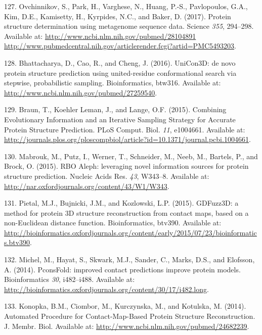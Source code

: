 \documentclass[11pt,a4paper,twoside]{book}
\theoremstyle{definition}
\theoremstyle{definition}
\theoremstyle{remark}
\begin{document}
\hypertarget{ref-Ovchinnikov2017}{}
127. Ovchinnikov, S., Park, H., Varghese, N., Huang, P.-S., Pavlopoulos,
G.A., Kim, D.E., Kamisetty, H., Kyrpides, N.C., and Baker, D. (2017).
Protein structure determination using metagenome sequence data. Science
\emph{355}, 294--298. Available at:
\href{http://www.ncbi.nlm.nih.gov/pubmed/28104891\%20http://www.pubmedcentral.nih.gov/articlerender.fcgi?artid=PMC5493203}{http://www.ncbi.nlm.nih.gov/pubmed/28104891 http://www.pubmedcentral.nih.gov/articlerender.fcgi?artid=PMC5493203}.

\hypertarget{ref-Bhattacharya2016}{}
128. Bhattacharya, D., Cao, R., and Cheng, J. (2016). UniCon3D: de novo
protein structure prediction using united-residue conformational search
via stepwise, probabilistic sampling. Bioinformatics, btw316. Available
at: \url{http://www.ncbi.nlm.nih.gov/pubmed/27259540}.

\hypertarget{ref-Braun2015}{}
129. Braun, T., Koehler Leman, J., and Lange, O.F. (2015). Combining
Evolutionary Information and an Iterative Sampling Strategy for Accurate
Protein Structure Prediction. PLoS Comput. Biol. \emph{11}, e1004661.
Available at:
\url{http://journals.plos.org/ploscompbiol/article?id=10.1371/journal.pcbi.1004661}.

\hypertarget{ref-Mabrouk2015a}{}
130. Mabrouk, M., Putz, I., Werner, T., Schneider, M., Neeb, M.,
Bartels, P., and Brock, O. (2015). RBO Aleph: leveraging novel
information sources for protein structure prediction. Nucleic Acids Res.
\emph{43}, W343--8. Available at:
\url{http://nar.oxfordjournals.org/content/43/W1/W343}.

\hypertarget{ref-Pietal2015a}{}
131. Pietal, M.J., Bujnicki, J.M., and Kozlowski, L.P. (2015). GDFuzz3D:
a method for protein 3D structure reconstruction from contact maps,
based on a non-Euclidean distance function. Bioinformatics, btv390.
Available at:
\url{http://bioinformatics.oxfordjournals.org/content/early/2015/07/23/bioinformatics.btv390}.

\hypertarget{ref-Michel2014}{}
132. Michel, M., Hayat, S., Skwark, M.J., Sander, C., Marks, D.S., and
Elofsson, A. (2014). PconsFold: improved contact predictions improve
protein models. Bioinformatics \emph{30}, i482--i488. Available at:
\url{http://bioinformatics.oxfordjournals.org/content/30/17/i482.long}.

\hypertarget{ref-Konopka2014}{}
133. Konopka, B.M., Ciombor, M., Kurczynska, M., and Kotulska, M.
(2014). Automated Procedure for Contact-Map-Based Protein Structure
Reconstruction. J. Membr. Biol. Available at:
\url{http://www.ncbi.nlm.nih.gov/pubmed/24682239}.
\end{document}
